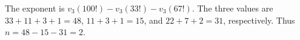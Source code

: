 The exponent is $v_3(100!)-v_3(33!)-v_3(67!)$. The three values are $33+11+3+1=48$, $11+3+1=15$, and $22+7+2=31$, respectively. Thus $\boxed{n=48-15-31=2}$.

